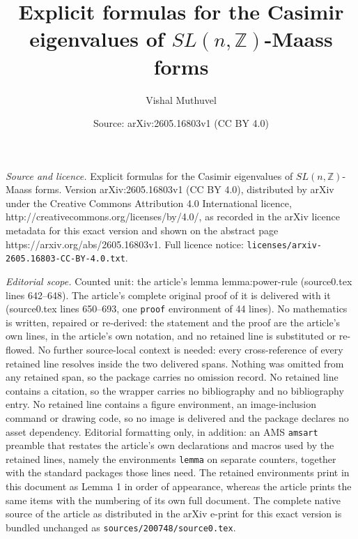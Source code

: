 \documentclass[10pt,a4paper]{amsart}
\title{Explicit formulas for the Casimir eigenvalues of $SL(n,\mathbb{Z})$-Maass forms}
\author{Vishal Muthuvel}
\date{Source: arXiv:2605.16803v1 (CC BY 4.0)}
\begin{document}
\maketitle

\noindent\emph{Source and licence.} Explicit formulas for the Casimir eigenvalues of $SL(n,\mathbb{Z})$-Maass forms. Version arXiv:2605.16803v1 (CC BY 4.0), distributed by arXiv under the Creative Commons Attribution 4.0 International licence, http://creativecommons.org/licenses/by/4.0/, as recorded in the arXiv licence metadata for this exact version and shown on the abstract page https://arxiv.org/abs/2605.16803v1. Full licence notice: \texttt{licenses/arxiv-2605.16803-CC-BY-4.0.txt}.\par\smallskip

\noindent\textit{Editorial scope.} Counted unit: the article's lemma lemma:power-rule (source0.tex lines 642--648). The article's complete original proof of it is delivered with it (source0.tex lines 650--693, one \texttt{proof} environment of 44 lines). No mathematics is written, repaired or re-derived: the statement and the proof are the article's own lines, in the article's own notation, and no retained line is substituted or re-flowed.  No further source-local context is needed: every cross-reference of every retained line resolves inside the two delivered spans.  Nothing was omitted from any retained span, so the package carries no omission record.  No retained line contains a citation, so the wrapper carries no bibliography and no bibliography entry.  No retained line contains a figure environment, an image-inclusion command or drawing code, so no image is delivered and the package declares no asset dependency.  Editorial formatting only, in addition: an AMS \texttt{amsart} preamble that restates the article's own declarations and macros used by the retained lines, namely the environments \texttt{lemma} on separate counters, together with the standard packages those lines need.  The retained environments print in this document as Lemma 1 in order of appearance, whereas the article prints the same items with the numbering of its own full document.  The complete native source of the article as distributed in the arXiv e-print for this exact version is bundled unchanged as \texttt{sources/200748/source0.tex}.
\end{document}
